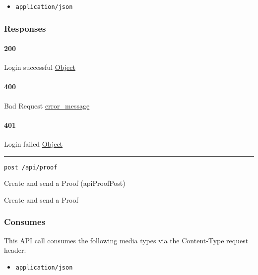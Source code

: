 \begin{itemize}
\tightlist
\item
  \texttt{application/json}
\end{itemize}

\hypertarget{responses-123}{%
\subsubsection{Responses}\label{responses-123}}

\hypertarget{section-401}{%
\paragraph{200}\label{section-401}}

Login successful \protect\hyperlink{Object}{Object}

\hypertarget{section-402}{%
\paragraph{400}\label{section-402}}

Bad Request \protect\hyperlink{error_message}{error\_message}

\hypertarget{section-403}{%
\paragraph{401}\label{section-403}}

Login failed \protect\hyperlink{Object}{Object}

\begin{center}\rule{0.5\linewidth}{\linethickness}\end{center}

\protect\hypertarget{apiProofPost}{}{}

\begin{verbatim}
post /api/proof
\end{verbatim}

Create and send a Proof ({apiProofPost})

Create and send a Proof

\hypertarget{consumes-39}{%
\subsubsection{Consumes}\label{consumes-39}}

This API call consumes the following media types via the {Content-Type}
request header:

\begin{itemize}
\tightlist
\item
  \texttt{application/json}
\end{itemize}

